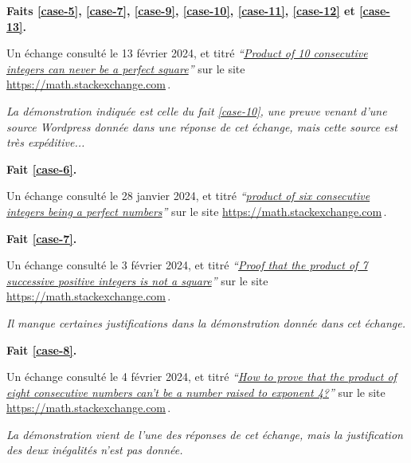 

\bigskip
\textbf{Faits \ref{case-5}, \ref{case-7}, \ref{case-9}, \ref{case-10}, \ref{case-11}, \ref{case-12} et \ref{case-13}.}
	
\smallskip
\noindent
Un échange consulté le 13 février 2024, et titré
\emph{\enquote{\href{https://math.stackexchange.com/q/2361670/52365}{Product of 10 consecutive integers can never be a perfect square}}} 
sur le site \url{https://math.stackexchange.com}\,.

\smallskip
\noindent
\emph{La démonstration indiquée est celle du fait \ref{case-10}, une preuve venant d'une source Wordpress donnée dans une réponse de cet échange, mais cette source est très expéditive...}




\bigskip
\textbf{Fait \ref{case-6}.}
	
\smallskip
\noindent
Un échange consulté le 28 janvier 2024, et titré
\emph{\enquote{\href{https://math.stackexchange.com/q/90894/52365}{product of six consecutive integers being a perfect numbers}}} 
sur le site \url{https://math.stackexchange.com}\,.




\bigskip
\textbf{Fait \ref{case-7}.}
	
\smallskip
\noindent
Un échange consulté le 3 février 2024, et titré
\emph{\enquote{\href{https://math.stackexchange.com/q/2334887/52365}{Proof that the product of 7 successive positive integers is not a square}}} 
sur le site \url{https://math.stackexchange.com}\,.
	
\smallskip
\noindent
\emph{Il manque certaines justifications dans la démonstration donnée dans cet échange.}




\bigskip
\textbf{Fait \ref{case-8}.}
	
\smallskip
\noindent
Un échange consulté le 4 février 2024, et titré
\emph{\enquote{\href{https://math.stackexchange.com/a/2271715/52365}{How to prove that the product of eight consecutive numbers can't be a number raised to exponent 4?}}} 
sur le site \url{https://math.stackexchange.com}\,.

\smallskip
\noindent
\emph{La démonstration vient de l'une des réponses de cet échange, mais la justification des deux inégalités n'est pas donnée.}


